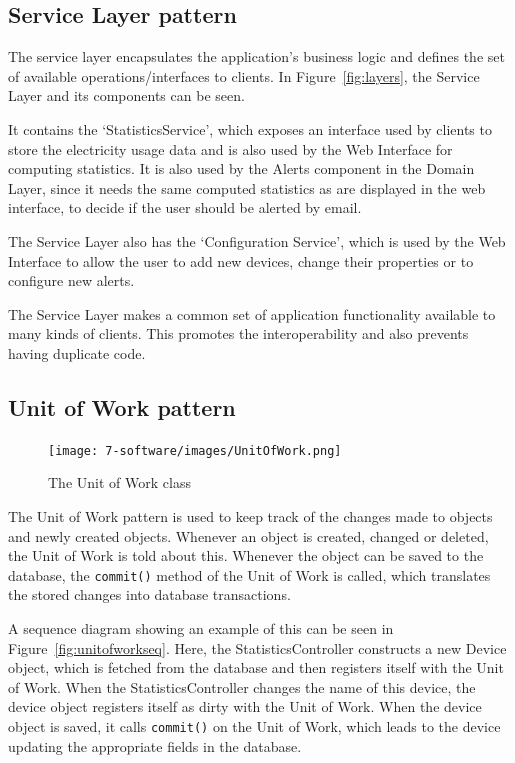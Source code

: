 

\subsection{Service Layer pattern}
\label{sec:service-layer-pattern}
The service layer encapsulates the application's business logic and defines the set of available operations/interfaces to clients. In Figure~\ref{fig:layers}, the Service Layer and its components can be seen. 

It contains the `StatisticsService', which exposes an interface used by clients to store the electricity usage data and is also used by the Web Interface for computing statistics. It is also used by the Alerts component in the Domain Layer, since it needs the same computed statistics as are displayed in the web interface, to decide if the user should be alerted by email.

The Service Layer also has the `Configuration Service', which is used by the Web Interface to allow the user to add new devices, change their properties or to configure new alerts.

The Service Layer makes a common set of application functionality available to many kinds of clients. This promotes the interoperability and also prevents having duplicate code.

\subsection{Unit of Work pattern}
\label{sec:unit-of-work-pattern}
\begin{figure}[H]
\centering
\texttt{[image: 7-software/images/UnitOfWork.png]}
\caption{The Unit of Work class}
\label{fig:unitofworkclass}
\end{figure}

The Unit of Work pattern is used to keep track of the changes made to objects and newly created objects. Whenever an object is created, changed or deleted, the Unit of Work is told about this. 
Whenever the object can be saved to the database, the \verb|commit()| method of the Unit of Work is called, which translates the stored changes into database transactions.

A sequence diagram showing an example of this can be seen in Figure~\ref{fig:unitofworkseq}. Here, the StatisticsController constructs a new Device object, which is fetched from the database and then registers itself with the Unit of Work. When the StatisticsController changes the name of this device, the device object registers itself as dirty with the Unit of Work. 
When the device object is saved, it calls \verb|commit()| on the Unit of Work, which leads to the device updating the appropriate fields in the database.


